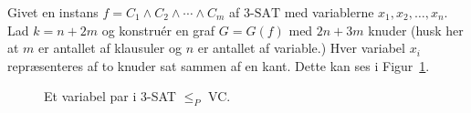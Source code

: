 Givet en instans $f = C_{1} \land C_{2} \land \cdots \land C_{m}$  af 3$\text{-SAT}$ med variablerne $x_{1}, x_{2}, \ldots, x_{n}$. Lad $k = n + 2m$ og konstruér en graf $G = G(f)$ med $2n+3m$ knuder (husk her at $m$ er antallet af klausuler og $n$ er antallet af variable.)
Hver variabel $x_{i}$ repræsenteres af to knuder sat sammen af en kant. Dette kan ses i Figur~\ref{fig:variablepairvc}.
\begin{figure}[ht]
\begin{center}
\end{center}
  \caption{\label{fig:variablepairvc} Et variabel par i 3-SAT $\le_{P}$ VC.}
\end{figure}

